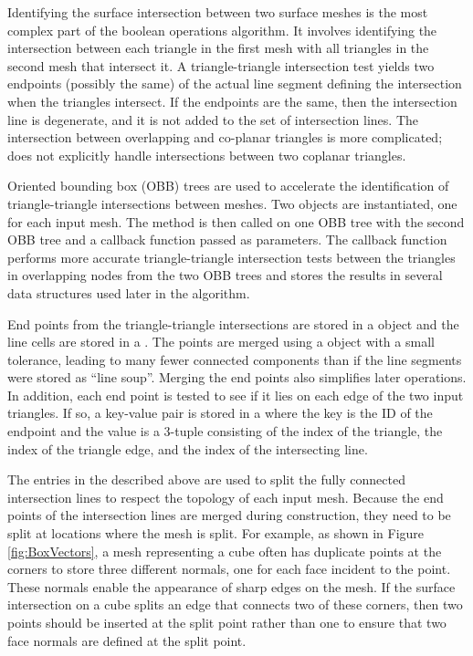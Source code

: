 \documentclass{InsightArticle}
\begin{document}
Identifying the surface intersection between two surface meshes is the most complex part of the boolean operations algorithm. It involves identifying the intersection between each triangle in the first mesh with all triangles in the second mesh that intersect it. A triangle-triangle intersection test yields two endpoints (possibly the same) of the actual line segment defining the intersection when the triangles intersect. If the endpoints are the same, then the intersection line is degenerate, and it is not added to the set of intersection lines. The intersection between overlapping and co-planar triangles is more complicated;  does not explicitly handle intersections between two coplanar triangles.

Oriented bounding box (OBB) trees are used to accelerate the identification of triangle-triangle intersections between meshes. Two  objects are instantiated, one for each input mesh. The method  is then called on one OBB tree with the second OBB tree and a callback function passed as parameters. The callback function performs more accurate triangle-triangle intersection tests between the triangles in overlapping nodes from the two OBB trees and stores the results in several data structures used later in the algorithm.

End points from the triangle-triangle intersections are stored in a  object and the line cells are stored in a . The points  are merged using a  object with a small tolerance, leading to many fewer connected components than if the line segments were stored as ``line soup''. Merging the end points also simplifies later operations. In addition, each end point is tested to see if it lies on each edge of the two input triangles. If so, a key-value pair is stored in a  where the key is the ID of the endpoint and the value is a 3-tuple consisting of the index of the triangle, the index of the triangle edge, and the index of the intersecting line.

The entries in the  described above are used to split the fully connected intersection lines to respect the topology of each input mesh. Because the end points of the intersection lines are merged during construction, they need to be split at locations where the mesh is split. For example, as shown in Figure \ref{fig:BoxVectors}, a mesh representing a cube often has duplicate points at the corners to store three different normals, one for each face incident to the point. These normals enable the appearance of sharp edges on the mesh. If the surface intersection on a cube splits an edge that connects two of these corners, then two points should be inserted at the split point rather than one to ensure that two face normals are defined at the split point.
\end{document}
